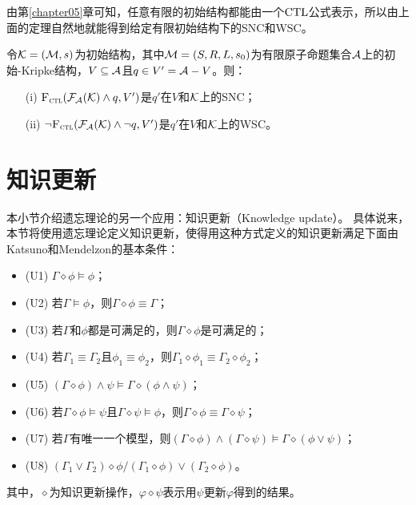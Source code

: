 由第\ref{chapter05}章可知，任意有限的初始结构都能由一个$\textrm{CTL}$公式表示，所以由上面的定理自然地就能得到给定有限初始结构下的SNC和WSC。
\begin{corollary}\label{thm:inK:SNC}
	令${\cal K}= ({\cal M}, s)$为初始结构，其中${\cal M}=(S,R,L,s_0)$为有限原子命题集合${\cal A}$上的初始-Kripke结构，$V \subseteq {\cal A}$且$q\in V' = {\cal A} - V$。则：
	\begin{itemize}
		\item[(i)] ${\textsc{F}_{\textsc{ctl}}}({\cal F}_{{\cal A}}({\cal K}) \wedge q, V')$是$q'$在$V$和${\cal K}$上的SNC；
		\item[(ii)] $\neg {\textsc{F}_{\textsc{ctl}}}({\cal F}_{{\cal A}}({\cal K}) \wedge \neg q, V')$是$q'$在$V$和${\cal K}$上的WSC。
	\end{itemize}
\end{corollary}

\section{知识更新}\label{chapter07:sec:update}
本小节介绍遗忘理论的另一个应用：知识更新（Knowledge update）。
具体说来，本节将使用遗忘理论定义知识更新，使得用这种方式定义的知识更新满足下面由Katsuno和Mendelzon的基本条件：
\begin{itemize}
	\item (U1)  $\Gamma \diamond \phi \models \phi$；
	\item (U2) 若$\Gamma \models \phi$，则$\Gamma \diamond \phi \equiv \Gamma$；
	\item (U3) 若$\Gamma$和$\phi$都是可满足的，则$\Gamma \diamond \phi$是可满足的；
	\item (U4) 若$\Gamma_1\equiv \Gamma_2$且$\phi_1 \equiv \phi_2$，则$\Gamma_1 \diamond \phi_1 \equiv \Gamma_2 \diamond \phi_2$；
	\item (U5) $(\Gamma \diamond \phi) \wedge \psi \models \Gamma \diamond(\phi \wedge \psi)$；
	\item (U6) 若$\Gamma \diamond \phi \models \psi$且$\Gamma \diamond \psi \models \phi$，则$\Gamma \diamond \phi \equiv \Gamma \diamond \psi$；
	\item (U7) 若$\Gamma$有唯一一个模型，则$(\Gamma \diamond \phi) \wedge (\Gamma \diamond \psi) \models \Gamma \diamond (\phi \vee \psi)$；
	\item (U8) $(\Gamma_1 \vee \Gamma_2) \diamond \phi                                                                                                                    / (\Gamma_1 \diamond \phi) \vee  (\Gamma_2 \diamond \phi)$。
\end{itemize}
其中，$\diamond$为知识更新操作，$\varphi \diamond \psi$表示用$\psi$更新$\varphi$得到的结果。

